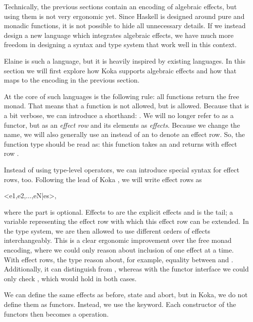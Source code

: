 Technically, the previous sections contain an encoding of algebraic effects, but using them is not very ergonomic yet. Since Haskell is designed around pure and monadic functions, it is not possible to hide all unnecessary details. If we instead design a new language which integrates algebraic effects, we have much more freedom in designing a syntax and type system that work well in this context.

Elaine is such a language, but it is heavily inspired by existing languages. In this section we will first explore how Koka \autocite{leijen_koka_2014,leijen_koka_2023} supports algebraic effects and how that maps to the encoding in the previous section.

At the core of such languages is the following rule: all functions return the free monad. That means that a function  is not allowed, but  is allowed. Because that is a bit verbose, we can introduce a shorthand: . We will no longer refer to  as a functor, but as an \emph{effect row} and its elements as \emph{effects}. Because we change the name, we will also generally use an  instead of an  to denote an effect row. So, the function type  should be read as: this function takes an  and returns  with effect row .

Instead of using type-level operators, we can introduce special syntax for effect rows, too. Following the lead of Koka \autocite{leijen_koka_2014}, we will write effect rows as
\begin{center}{\ttfamily<e1,e2,...,eN|es>},\end{center}
where the  part is optional. Effects  to  are the explicit effects and  is the tail; a variable representing the effect row with which this effect row can be extended. In the type system, we are then allowed to use different orders of effects interchangeably. This is a clear ergonomic improvement over the free monad encoding, where we could only reason about inclusion of one effect at a time. With effect rows, the type reason about, for example, equality between  and . Additionally, it can distinguish  from , whereas with the functor interface we could only check , which would hold in both cases.

We can define the same effects as before, state and abort, but in Koka, we do not define them as functors. Instead, we use the  keyword. Each constructor of the functors then becomes a  operation.

